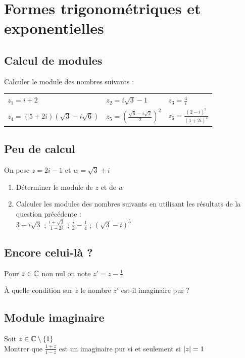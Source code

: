\documentclass[oneside,12pt]{book}          %
\begin{document}
\section{Formes trigonométriques et exponentielles}

\subsection{Calcul de modules}
Calculer le module des nombres suivants :\\
\begin{tabular}{p{} p{} p{}}
	$z_1=i+2$ & $z_2=i\sqrt{3}-1$ & $z_3=\frac{4}{i}$ \\
    $z_4=(5+2i)(\sqrt{3}-i\sqrt{6})$ & $z_5=\left(\frac{\sqrt{6}-i\sqrt{2}}{2}\right)^2$ & $z_6=\frac{(2-i)^5}{(1+2i)^4}$
\end{tabular}



\subsection{Peu de calcul}
On pose $z=2i-1$ et $w=\sqrt{3}+i$
\begin{enumerate}
	\item Déterminer le module de $z$ et de $w$
	\item Calculer les modules des nombres suivants en utilisant les résultats de la question précédente :\\[5pt]
$3+i\sqrt{3}$ \quad\quad ; \quad $\frac{i+\sqrt{3}}{1-2i}$ \quad\quad ; \quad $\frac{i}{2}-\frac{1}{4}$ \quad\quad ; \quad $(\sqrt{3}-i)^5$ 
\end{enumerate}



\subsection{Encore celui-là ?}
Pour $z\in{\mathbb C}$ non nul on note $z'=z-\frac{1}{z}$

À quelle condition sur $z$ le nombre $z'$ est-il imaginaire pur ?



\subsection{Module imaginaire}
Soit $z\in{\mathbb C}\setminus\{1\}$\\
Montrer que $\frac{1+z}{1-z}$ est un imaginaire pur si et seulement si ${\left\lvert z \right\rvert}=1$
\end{document}
